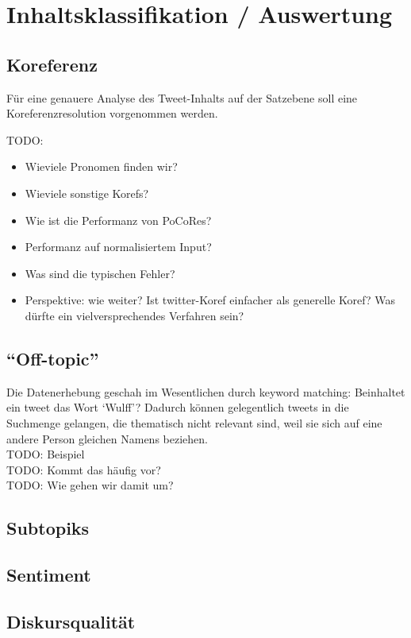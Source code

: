 \documentclass[11pt]{article}
\begin{document}
\section{Inhaltsklassifikation / Auswertung}

\subsection{Koreferenz}
Für eine genauere Analyse des Tweet-Inhalts auf der Satzebene soll
eine Koreferenzresolution vorgenommen werden.

TODO:
\begin{itemize}
\item Wieviele Pronomen finden wir?
\item Wieviele sonstige Korefs?
\item Wie ist die Performanz von PoCoRes?
\item Performanz auf normalisiertem Input?
\item Was sind die typischen Fehler?
\item Perspektive: wie weiter? Ist twitter-Koref einfacher als
  generelle Koref? Was dürfte ein vielversprechendes Verfahren sein?
\end{itemize}

\subsection{``Off-topic''}
Die Datenerhebung geschah im Wesentlichen durch keyword matching:
Beinhaltet ein tweet das Wort `Wulff'? Dadurch können gelegentlich
tweets in die Suchmenge gelangen, die thematisch nicht relevant sind,
weil sie sich auf eine andere Person gleichen Namens beziehen.\\
TODO: Beispiel\\
TODO: Kommt das häufig vor?\\
TODO: Wie gehen wir damit um?

\subsection{Subtopiks}

\subsection{Sentiment}

\subsection{Diskursqualität}
\end{document}

